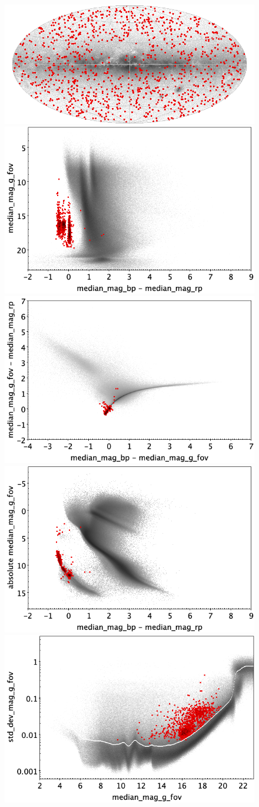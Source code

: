 \documentclass[longauth]{aa}
\begin{document}
\begin{appendix}
\begin{figure}
\centering
{} \includegraphics[width=0.6\hsize]{figures/appendix/WD_trn_sky.png} \\ %
\vspace{4mm}
 \includegraphics[width=0.45\hsize]{figures/appendix/WD_trn_cm.png}  %
\hspace{2mm}
 \includegraphics[width=0.45\hsize]{figures/appendix/WD_trn_cc.png} \\ %
\vspace{4mm}
 \includegraphics[width=0.45\hsize]{figures/appendix/WD_trn_cam.png}  %
\hspace{2mm}
 \includegraphics[width=0.45\hsize]{figures/appendix/WD_trn_msd.png} \\ %

\end{figure}
\end{appendix}
\end{document}
